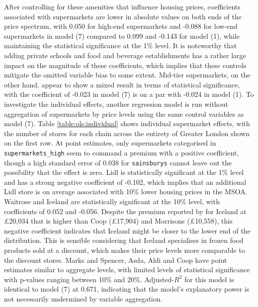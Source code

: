 \documentclass{article}
\begin{document}
After controlling for these amenities that influence housing prices, coefficients associated with supermarkets are lower in absolute values on both ends of the price spectrum, with 0.050 for high-end supermarkets and -0.088 for low-end supermarkets in model (7) compared to 0.099 and -0.143 for model (1), while maintaining the statistical significance at the 1\% level. It is noteworthy that adding private schools and food and beverage establishments has a rather large impact on the magnitude of these coefficients, which implies that these controls mitigate the omitted variable bias to some extent. Mid-tier supermarkets, on the other hand, appear to show a mixed result in terms of statistical significance, with the coefficient of -0.023 in model (7) is on a par with -0.024 in model (1). To investigate the individual effects, another regression model is run without aggregation of supermarkets by price levels using the same control variables as model (7). Table \ref{table:ols:individual} shows individual supermarket effects, with the number of stores for each chain across the entirety of Greater London shown on the first row. At point estimates, only supermarkets categorised in \texttt{supermarkets\_high} seem to command a premium with a positive coefficient, though a high standard error of 0.038 for \texttt{sainsburys} cannot leave out the possibility that the effect is zero. Lidl is statistically significant at the 1\% level and has a strong negative coefficient of -0.102, which implies that an additional Lidl store is on average associated with 10\% lower housing prices in the MSOA. Waitrose and Iceland are statistically significant at the 10\% level, with coefficients of 0.052 and -0.056. Despite the premium reported by \citet{LloydsBank2016LivingHome} for Iceland at £20,034 that is higher than Coop (£17,904) and Morrisons (£10,558), this negative coefficient indicates that Iceland might be closer to the lower end of the distribution. This is sensible considering that Iceland specialises in frozen food products sold at a discount, which makes their price levels more comparable to the discount stores. Marks and Spencer, Asda, Aldi and Coop have point estimates similar to aggregate levels, with limited levels of statistical significance with p-values ranging between 10\% and 20\%. Adjusted-$R^2$ for this model is identical to model (7) at 0.671, indicating that the model's explanatory power is not necessarily undermined by variable aggregation. 
\end{document}
